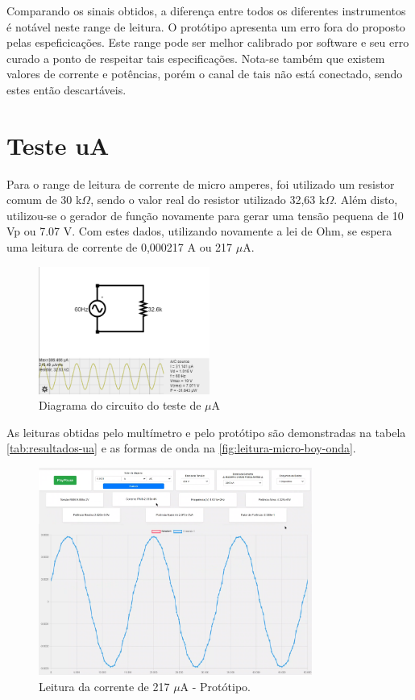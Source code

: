 Comparando os sinais obtidos, a diferença entre todos os diferentes instrumentos é notável neste range de leitura. O protótipo apresenta um erro fora do proposto pelas espeficicações. Este range pode ser melhor calibrado por software e seu erro curado a ponto de respeitar tais especificações. Nota-se também que existem valores de corrente e potências, porém o canal de tais não está conectado, sendo estes então descartáveis.

\section{Teste uA}\label{teste-ua}

Para o range de leitura de corrente de micro amperes, foi utilizado um resistor comum de 30 k$\Omega$, sendo o valor real do resistor utilizado 32,63 k$\Omega$. Além disto, utilizou-se o gerador de função novamente para gerar uma tensão pequena de 10 Vp ou 7.07 V. Com estes dados, utilizando novamente a lei de Ohm, se espera uma leitura de corrente de 0,000217 A ou 217 $\mu$A.

\begin{figure}[htb!]
    \caption{Diagrama do circuito do teste de $\mu$A}
    \label{fig:circ-ua}
    \includegraphics[width=0.5\textwidth]{figuras/circ-ua-falstad.png}
    \fonte{}
\end{figure}

As leituras obtidas pelo multímetro e pelo protótipo são demonstradas na tabela \autoref{tab:resultados-ua} e as formas de onda na \autoref{fig:leitura-micro-boy-onda}.

\begin{figure}[htb!]
    \caption{Leitura da corrente de 217 $\mu$A - Protótipo.}
    \label{fig:leitura-micro-boy-onda}
    \includegraphics[width=0.8\textwidth]{figuras/leitura-micro-boy-onda.png}
    \fonte{}
\end{figure}

